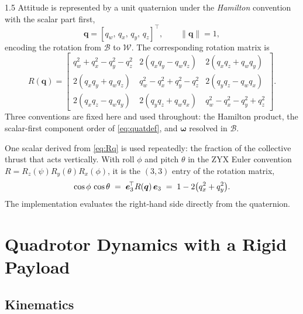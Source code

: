 \begin{spacing}{1.5}
Attitude is represented by a unit quaternion under the \emph{Hamilton} convention
with the scalar part first,
\begin{equation}
\bm{q} = [q_w,\, q_x,\, q_y,\, q_z]^{\!\top},
\qquad \|\bm{q}\| = 1,
\label{eq:quatdef}
\end{equation}
encoding the rotation from $\mathcal{B}$ to $\mathcal{W}$. The corresponding
rotation matrix is
\begin{equation}
R(\bm{q}) =
\begin{bmatrix}
q_w^2 + q_x^2 - q_y^2 - q_z^2 & 2(q_xq_y - q_wq_z) & 2(q_xq_z + q_wq_y) \\[2pt]
2(q_xq_y + q_wq_z) & q_w^2 - q_x^2 + q_y^2 - q_z^2 & 2(q_yq_z - q_wq_x) \\[2pt]
2(q_xq_z - q_wq_y) & 2(q_yq_z + q_wq_x) & q_w^2 - q_x^2 - q_y^2 + q_z^2
\end{bmatrix}.
\label{eq:Rq}
\end{equation}
Three conventions are fixed here and used throughout: the Hamilton product, the
scalar-first component order of \eqref{eq:quatdef}, and $\bm{\omega}$ resolved
in $\mathcal{B}$.

One scalar derived from \eqref{eq:Rq} is used repeatedly: the fraction of the
collective thrust that acts vertically. With roll $\phi$ and pitch $\theta$ in
the ZYX Euler convention $R = R_z(\psi)R_y(\theta)R_x(\phi)$, it is the $(3,3)$
entry of the rotation matrix,
\begin{equation}
\cos\phi\,\cos\theta \;=\; \bm{e}_3^{\!\top} R(\bm{q})\, \bm{e}_3 \;=\; 1 - 2\bigl(q_x^2+q_y^2\bigr).
\label{eq:costheta}
\end{equation}
The implementation evaluates the right-hand side directly from the quaternion.

\section{Quadrotor Dynamics with a Rigid Payload}\label{sec:model:dyn}

\subsection{Kinematics}\label{sec:model:kin}


\end{spacing}
